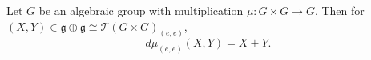 Let $G$ be an algebraic group with multiplication $\mu: G \times G \to G$. Then for $(X, Y) \in \mathfrak{g} \oplus \mathfrak{g} \cong \mathcal{T}(G \times G)_{(e,e)}$,
$$d\mu_{(e,e)}(X, Y) = X + Y.$$
